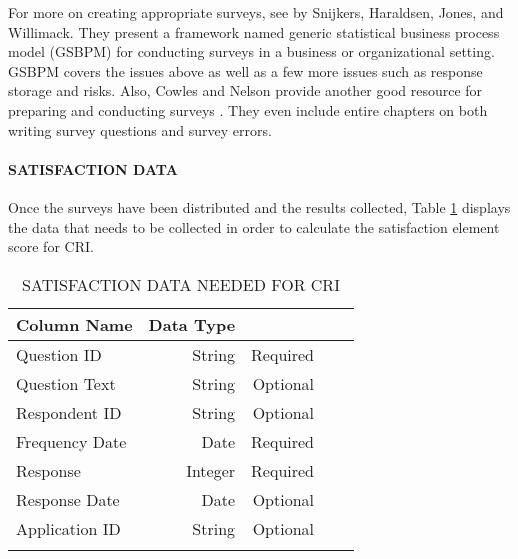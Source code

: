 \documentclass[SDSUThesis.tex]{subfiles}
\begin{document}
                
           
            For more on creating appropriate surveys, see \cite{Snijkers2013} by Snijkers,
            Haraldsen, Jones, and Willimack. They present a framework
            named generic statistical business process model (GSBPM) for conducting surveys
            in a business or organizational setting.  GSBPM covers the issues above as well
            as a few more issues such as response storage and risks.  Also, Cowles and Nelson
            provide another good resource for preparing and conducting surveys 
            \cite{Cowles2015}.  They even include entire chapters on both writing 
            survey questions and survey errors. 
            
            \paragraph{SATISFACTION DATA}
                Once the surveys have been distributed and the results collected, Table
                \ref{tab:satisfactiondata} displays the data that needs to be collected 
                in order to calculate the satisfaction element score for CRI.
                \begin{longtable}{@{}l rr rr}
                    \toprule%
                     \centering%
                     {\bfseries Column Name}
                     & {\bfseries Data Type}
                     &  \\
                    
                    \cmidrule[0.4pt](r{0.125em}){1-1}%
                    \cmidrule[0.4pt](lr{0.125em}){2-2}%
                    \cmidrule[0.4pt](l{0.125em}){3-3}%
                    \endhead
                    
                    Question ID & String  & Required \\
                    \myrowcolour%
                    Question Text & String  & Optional \\
                    Respondent ID & String & Optional \\
                    \myrowcolour%
                    Frequency Date & Date & Required \\
                    Response & Integer & Required \\
                    \myrowcolour%
                    Response Date & Date & Optional \\
                    Application ID & String & Optional \\
                    
                    \bottomrule
                    
                    \caption{SATISFACTION DATA NEEDED FOR CRI}
                    \label{tab:satisfactiondata}
                \end{longtable}
            
\end{document}
